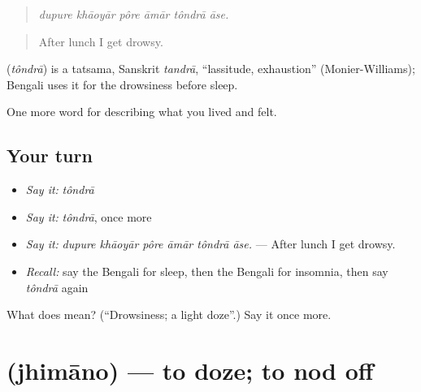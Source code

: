 \begin{quote}
     
\end{quote}

\begin{quote}
\emph{dupure khāoyār pôre āmār tôndrā āse.}
\end{quote}

\begin{quote}
After lunch I get drowsy.
\end{quote}

\begin{cousinweb}
\textbf{} (\emph{tôndrā}) is a tatsama, Sanskrit \emph{tandrā}, \textquotedblleft{}lassitude, exhaustion\textquotedblright{} (Monier-Williams); Bengali uses it for the drowsiness before sleep.
\end{cousinweb}

\begin{grammarlens}[title={What you've built}]
One more word for describing what you lived and felt.
\end{grammarlens}

\subsection*{Your turn}
\begin{itemize}
\raggedright
  \item \emph{Say it:} \emph{tôndrā}
  \item \emph{Say it:} \emph{tôndrā}, once more
  \item \emph{Say it:} \emph{dupure khāoyār pôre āmār tôndrā āse.} — After lunch I get drowsy.
  \item \emph{Recall:} say the Bengali for sleep, then the Bengali for insomnia, then say \emph{tôndrā} again
\end{itemize}

\begin{tcolorbox}[breakable,colback=teal!4,colframe=teal!35!black,title={Before you move on}]
What does  mean? (\textquotedblleft{}Drowsiness; a light doze\textquotedblright{}.) Say it once more.
\end{tcolorbox}
\section[\texorpdfstring{\bn{ঝিমানো} (jhimāno)}{ঝিমানো (jhimāno)}]{ (jhimāno) — to doze; to nod off}

\label{lesson:BN-C479-jhimano}



